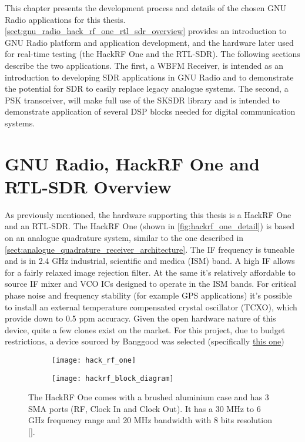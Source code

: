 This chapter presents the development process and details of the chosen GNU Radio applications for this thesis. \autoref{sect:gnu_radio_hack_rf_one_rtl_sdr_overview} provides an introduction to GNU Radio platform and application development, and the hardware later used for real-time testing (the HackRF One and the RTL-SDR). The following sections describe the two applications. The first, a WBFM Receiver, is intended as an introduction to developing SDR applications in GNU Radio and to demonstrate the potential for SDR to easily replace legacy analogue systems. The second, a PSK transceiver, will make full use of the SKSDR library and is intended to demonstrate application of several DSP blocks needed for digital communication systems.

\section{GNU Radio, HackRF One and RTL-SDR Overview}
\label{sect:gnu_radio_hack_rf_one_rtl_sdr_overview}

As previously mentioned, the hardware supporting this thesis is a HackRF One and an RTL-SDR. The HackRF One (shown in \autoref{fig:hackrf_one_detail}) is based on an analogue quadrature system, similar to the one described in \autoref{sect:analogue_quadrature_receiver_architecture}. The IF frequency is tuneable and is in 2.4 GHz industrial, scientific and medica (ISM) band. A high IF allows for a fairly relaxed image rejection filter. At the same it's relatively affordable to source IF mixer and VCO ICs designed to operate in the ISM bands. For critical phase noise and frequency stability (for example GPS applications) it's possible to install an external temperature compensated crystal oscillator (TCXO), which provide down to 0.5 ppm accuracy. Given the open hardware nature of this device, quite a few clones exist on the market. For this project, due to budget restrictions, a device sourced by Banggood was selected (specifically \href{https://pt.banggood.com/HackRF-One-1MHz-6GHz-Radio-Platform-Development-Board-Software-Defined-RTL-SDR-Demoboard-Kit-Dongle-Receiver-Ham-Radio-p-1552853.html}{this one})

\begin{figure} [ht]
  \begin{subfigure}{.5\textwidth}
    \centering
    \texttt{[image: hack\_rf\_one]}
    \label{fig:hackrf_one_case}
  \end{subfigure}
  \begin{subfigure}{.5\textwidth}
    \centering
    \texttt{[image: hackrf\_block\_diagram]}
    \label{fig:hackrf_one_block_diagram}
  \end{subfigure}
  \caption[The HackRF One case and block diagram]{The HackRF One comes with a brushed aluminium case and has 3 SMA ports (RF, Clock In and Clock Out). It has a 30 MHz to 6 GHz frequency range and 20 MHz bandwidth with 8 bits resolution [\citeauthor{hackrf_one_product}].}
  \label{fig:hackrf_one_detail}
\end{figure}


